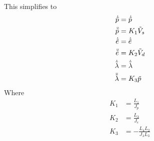 This simplifies to
\begin{subequations}\label{eq:P1_linearised_equations_of_motion}
    \begin{align}
        \dot{\tilde{p}} &= \dot{\tilde{p}} \nonumber \\ 
        \ddot{\tilde{p}} &= K_1 \tilde{V}_s \label{eq:P1_linearised_equation_of_motion_p_ddot} \\
        \dot{\tilde{e}} &= \dot{\tilde{e}} \nonumber \\
        \ddot{\tilde{e}} &= K_2 \tilde{V}_d \label{eq:P1_linearised_equation_of_motion_e_ddot} \\
        \dot{\tilde{\lambda}} &= \dot{\tilde{\lambda}} \nonumber \\
        \ddot{\tilde{\lambda}} &= K_3 \tilde{p} \label{eq:P1_linearised_equation_of_motion_lambda_ddot}
    \end{align}
\end{subequations}    
Where
\begin{subequations}
    \begin{align}
        K_1 &= \frac{L_1}{J_p} \label{eq:P1_lin_K1} \\
        K_2 &= \frac{L_3}{J_e} \label{eq:P1_lin_K2} \\
        K_3 &= -\frac{L_4 L_2}{J_\lambda L_3} \label{eq:P1_lin_K3}
    \end{align}
\end{subequations}